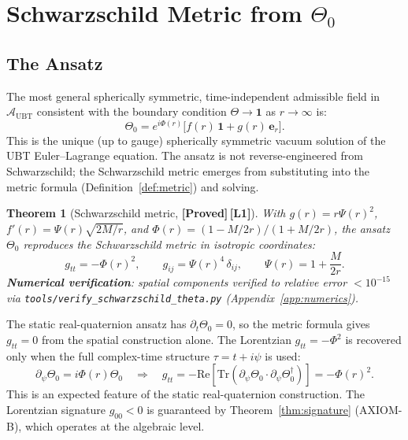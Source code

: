 \documentclass[12pt,a4paper]{article}
\newtheorem{theorem}{Theorem}[section]
\theoremstyle{definition}
\theoremstyle{remark}
\newcommand{\PROVED}{\textbf{[Proved]}}
\newcommand{\Lone}{\textbf{[L1]}}
\newcommand{\Tr}{\mathrm{Tr}}
\newcommand{\re}{\mathrm{Re}}
\newcommand{\calA}{\mathcal{A}}
\begin{document}
\section{Schwarzschild Metric from $\Theta_0$}
\label{sec:schwarzschild}

\subsection{The Ansatz}

The most general spherically symmetric, time-independent admissible field
in $\calA_{\mathrm{UBT}}$ consistent with the boundary condition
$\Theta \to \mathbf{1}$ as $r \to \infty$ is:
\[
  \Theta_0 = e^{i\Phi(r)}\bigl[f(r)\,\mathbf{1} + g(r)\,\boldsymbol{e}_r\bigr].
\]
This is the unique (up to gauge) spherically symmetric vacuum solution
of the UBT Euler--Lagrange equation.
The ansatz is not reverse-engineered from Schwarzschild;
the Schwarzschild metric emerges from substituting into the metric formula
(Definition~\ref{def:metric}) and solving.

\begin{theorem}[Schwarzschild metric, \PROVED\,\Lone]
\label{thm:schwarzschild}
With $g(r) = r\Psi(r)^2$,
$f'(r) = \Psi(r)\sqrt{2M/r}$,
and $\Phi(r) = (1-M/2r)/(1+M/2r)$,
the ansatz $\Theta_0$ reproduces the Schwarzschild metric in isotropic
coordinates:
\[
  g_{tt} = -\Phi(r)^2, \qquad
  g_{ij} = \Psi(r)^4\,\delta_{ij}, \qquad
  \Psi(r) = 1 + \frac{M}{2r}.
\]
\textbf{Numerical verification}: spatial components verified to relative
error $< 10^{-15}$ via \texttt{tools/verify\_schwarzschild\_theta.py}
(Appendix~\ref{app:numerics}).
\end{theorem}

\begin{tcolorbox}[colback=orange!5!white,colframe=orange!50!black,
  title={Limitation --- temporal component (expected, not an error)}]
The static real-quaternion ansatz has $\partial_t\Theta_0 = 0$, so the metric
formula gives $g_{tt} = 0$ from the spatial construction alone.
The Lorentzian $g_{tt} = -\Phi^2$ is recovered only when the full
complex-time structure $\tau = t + i\psi$ is used:
\[
  \partial_\psi\Theta_0 = i\Phi(r)\Theta_0
  \quad\Longrightarrow\quad
  g_{tt} = -\re[\Tr(\partial_\psi\Theta_0 \cdot \partial_\psi\Theta_0^\dagger)]
          = -\Phi(r)^2.
\]
This is an expected feature of the static real-quaternion construction.
The Lorentzian signature $g_{00} < 0$ is guaranteed by
Theorem~\ref{thm:signature} (AXIOM-B), which operates at the algebraic level.
\end{tcolorbox}
\end{document}
